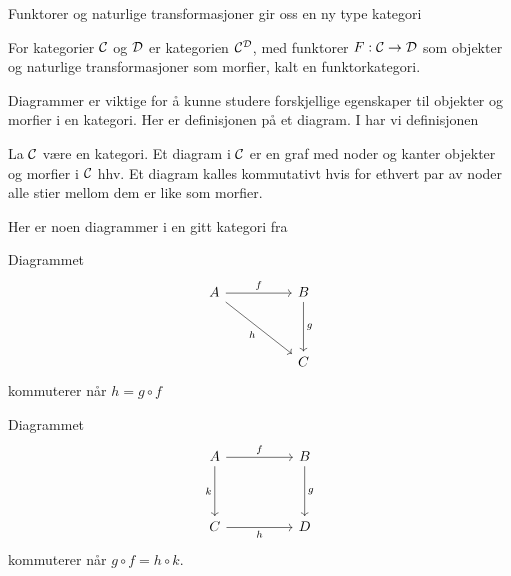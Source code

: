Funktorer og naturlige transformasjoner gir oss en ny type kategori 
\begin{definisjon}\label{Def:FunkKat}
    For kategorier $\mathcal{C}$ og $\mathcal{D}$ er kategorien
    $\mathcal{C}^{\mathcal{D}}$, med funktorer $F:\mathcal{C}\to \mathcal{D}$ som
    objekter og naturlige transformasjoner som morfier,
    kalt en funktorkategori.
\end{definisjon}

Diagrammer er viktige for å kunne studere forskjellige egenskaper til objekter og morfier i en kategori. Her er
definisjonen på et diagram. I \citep[definisjon
1.4.9]{Agore2023} har vi definisjonen

\begin{definisjon}\label{def:Diagram}
   La $\mathcal{C}$ være en kategori. Et diagram i $\mathcal{C}$ er en
   graf med noder og kanter objekter og morfier i $\mathcal{C}$
   hhv. Et diagram kalles kommutativt hvis for ethvert
   par av noder alle stier mellom dem er like som morfier.
\end{definisjon}


Her er noen diagrammer i en gitt kategori fra
\citep[eksempler 1.4.10]{Agore2023}

\begin{eksempel}\label{eks:Diag1}
  Diagrammet
  \[\begin{tikzcd}
	A && B \\
	\\
	&& C
	\arrow["f", from=1-1, to=1-3]
	\arrow["h"', from=1-1, to=3-3]
	\arrow["g", from=1-3, to=3-3]
  \end{tikzcd}\]
  kommuterer når $h = g\circ f$
\end{eksempel}

\begin{eksempel}\label{eks:Diag2}
   Diagrammet
   \[\begin{tikzcd}
     A && B \\
     \\
     C && D
     \arrow["f", from=1-1, to=1-3]
     \arrow["k"', from=1-1, to=3-1]
     \arrow["g", from=1-3, to=3-3]
     \arrow["h"', from=3-1, to=3-3]
   \end{tikzcd}\]
   kommuterer når $g\circ f = h\circ k$.
\end{eksempel}


